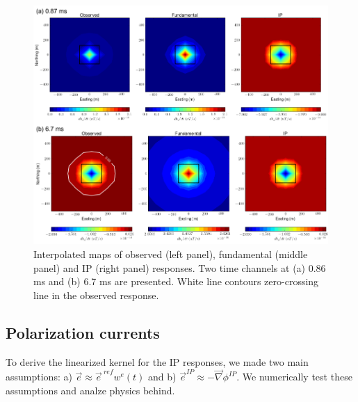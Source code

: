 \documentclass[a4paper, 11pt]{article}
\newcommand{\grad}{\vec \nabla}
\newcommand {\e}  { {\vec e} }
\newcommand{\eref}{\e^{\ ref}}
\begin{document}
\begin{figure}[htb]
  \centering
  \includegraphics[width=1.\textwidth]{figures/IPresp_Plan.png}
  \caption{Interpolated maps of observed (left panel), fundamental (middle panel) and IP (right panel) responses. Two time channels at (a) 0.86 ms and (b) 6.7 ms are presented. White line contours zero-crossing line in the observed response.  
  }
  \label{F:IPresp_Plan}
\end{figure}
\clearpage

\subsection{Polarization currents}
To derive the linearized kernel for the IP responses, we made two main assumptions: a) $\e \approx \eref w^e(t)$ and b) $\e^{IP} \approx -\grad\phi^{IP}$. We numerically test these assumptions and analze physics behind.
\end{document}
